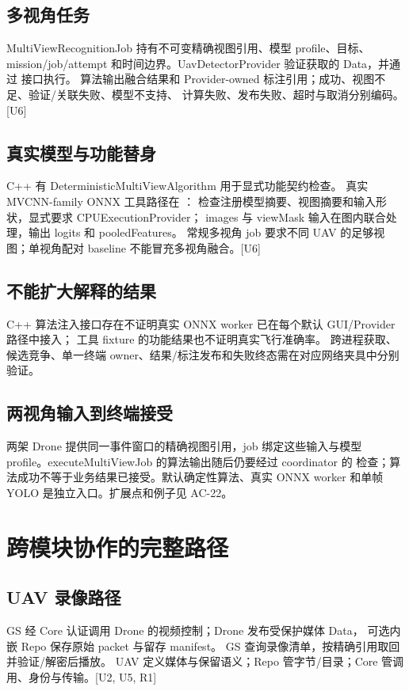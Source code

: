 \subsection{多视角任务}
MultiViewRecognitionJob 持有不可变精确视图引用、模型 profile、目标、mission/job/attempt
和时间边界。UavDetectorProvider 验证获取的 Data，并通过
 接口执行。
算法输出融合结果和 Provider-owned 标注引用；成功、视图不足、验证/关联失败、模型不支持、
计算失败、发布失败、超时与取消分别编码。[U6]

\subsection{真实模型与功能替身}
C++ 有 DeterministicMultiViewAlgorithm 用于显式功能契约检查。
真实 MVCNN-family ONNX 工具路径在 ：
检查注册模型摘要、视图摘要和输入形状，显式要求 CPUExecutionProvider；
images 与 viewMask 输入在图内联合处理，输出 logits 和 pooledFeatures。
常规多视角 job 要求不同 UAV 的足够视图；单视角配对 baseline 不能冒充多视角融合。[U6]

\subsection{不能扩大解释的结果}
C++ 算法注入接口存在不证明真实 ONNX worker 已在每个默认 GUI/Provider 路径中接入；
工具 fixture 的功能结果也不证明真实飞行准确率。
跨进程获取、候选竞争、单一终端 owner、结果/标注发布和失败终态需在对应网络夹具中分别验证。


\subsection{两视角输入到终端接受}
两架 Drone 提供同一事件窗口的精确视图引用，job 绑定这些输入与模型 profile。executeMultiViewJob 的算法输出随后仍要经过 coordinator 的  检查；算法成功不等于业务结果已接受。默认确定性算法、真实 ONNX worker 和单帧 YOLO 是独立入口。扩展点和例子见 AC-22。

\newpage

\section{跨模块协作的完整路径}
\subsection{UAV 录像路径}
GS 经 Core 认证调用 Drone 的视频控制；Drone 发布受保护媒体 Data，
可选内嵌 Repo 保存原始 packet 与留存 manifest。
GS 查询录像清单，按精确引用取回并验证/解密后播放。
UAV 定义媒体与保留语义；Repo 管字节/目录；Core 管调用、身份与传输。[U2, U5, R1]

